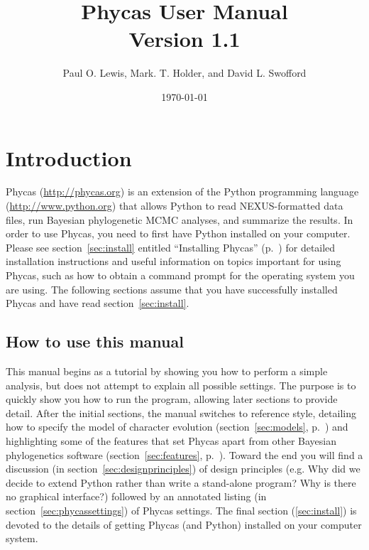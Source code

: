 \documentclass[10pt]{article}
\begin{document}
\title{{\sc Phycas User Manual} \\ Version 1.1}
\author{Paul O. Lewis, Mark. T. Holder, and David L. Swofford}
\date{\today}
\maketitle

\tableofcontents

\section{Introduction}

Phycas (\url{http://phycas.org}) is an extension of the Python programming language (\url{http://www.python.org}) that allows Python to read NEXUS-formatted data files, run Bayesian phylogenetic MCMC analyses, and summarize the results. In order to use Phycas, you need to first have Python installed on your computer. Please see section~\ref{sec:install} entitled ``Installing Phycas'' (p.~\pageref{sec:install}) for detailed installation instructions and useful information on topics important for using Phycas, such as how to obtain a command prompt for the operating system you are using. The following sections assume that you have successfully installed Phycas and have read section~\ref{sec:install}.

\subsection{How to use this manual}
This manual begins as a tutorial by showing you how to perform a simple analysis, but does not attempt to explain all possible settings. The purpose is to quickly show you how to run the program, allowing later sections to provide detail. After the initial sections, the manual switches to reference style, detailing how to specify the model of character evolution (section~\ref{sec:models}, p.~\pageref{sec:models}) and highlighting some of the features that set Phycas apart from other Bayesian phylogenetics software (section~\ref{sec:features}, p.~\pageref{sec:features}). Toward the end you will find a discussion (in section~\ref{sec:designprinciples}) of design principles (e.g. Why did we decide to extend Python rather than write a stand-alone program? Why is there no graphical interface?) followed by an annotated listing (in section~\ref{sec:phycassettings}) of Phycas settings. The final section (\ref{sec:install}) is devoted to the details of getting Phycas (and Python) installed on your computer system.
\end{document}
